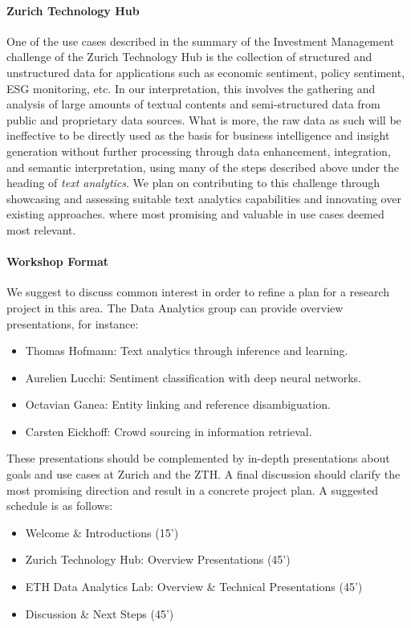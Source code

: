 \documentclass{article}
\begin{document}
\paragraph{Zurich Technology Hub} One of the use cases described in the summary of the Investment Management challenge of the Zurich Technology Hub is the collection of structured and unstructured data for applications such as economic sentiment, policy sentiment, ESG monitoring, etc. In our interpretation, this involves the gathering and analysis of large amounts of  textual contents and semi-structured data from public and proprietary data sources. What is more, the raw data as such will be ineffective to be directly used as the basis for business intelligence and insight generation without further processing through data enhancement, integration, and semantic interpretation, using many of the steps described above under the heading of \textit{text analytics}. We plan on contributing to this challenge through showcasing and assessing suitable text analytics capabilities and innovating over existing approaches. where most promising and valuable in use cases deemed most relevant.  

\paragraph{Workshop Format} We suggest to discuss common interest in order to refine a plan for a research project in this area.  The Data Analytics group can provide overview presentations, for instance:
\begin{itemize}
\setlength{\itemsep}{0mm}
\item Thomas Hofmann: Text analytics through inference and learning.
\item Aurelien Lucchi: Sentiment classification with deep neural networks.
\item Octavian Ganea: Entity linking and reference disambiguation.
\item Carsten Eickhoff: Crowd sourcing in information retrieval. 
\end{itemize}
These presentations should be complemented by in-depth presentations about goals and use cases at Zurich and the ZTH.  A final discussion should clarify the most promising direction and result in a concrete project plan. A suggested schedule is as follows: 
\begin{itemize}
\setlength{\itemsep}{0mm}
\item Welcome \& Introductions (15') 
\item Zurich Technology Hub: Overview Presentations (45')
\item ETH Data Analytics Lab: Overview \& Technical Presentations (45') 
\item Discussion \& Next Steps (45')
\end{itemize}

\newpage
 



\end{document}
